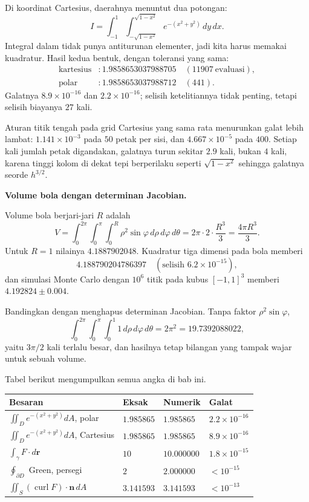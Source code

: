 Di koordinat Cartesius, daerahnya menuntut dua potongan:
\[
I=\int_{-1}^{1}\!\!\int_{-\sqrt{1-x^{2}}}^{\sqrt{1-x^{2}}}
e^{-(x^{2}+y^{2})}\,dy\,dx .
\]
Integral dalam tidak punya antiturunan elementer, jadi kita harus memakai
kuadratur. Hasil kedua bentuk, dengan toleransi yang sama:
\begin{align*}
\text{kartesius}&: 1.9858653037988705 \quad (11907\ \text{evaluasi}),\\
\text{polar}&: 1.9858653037988712 \quad (441).
\end{align*}
Galatnya $8.9\times10^{-16}$ dan $2.2\times10^{-16}$; selisih ketelitiannya
tidak penting, tetapi selisih biayanya $27$ kali.

Aturan titik tengah pada grid Cartesius yang sama rata menurunkan galat lebih
lambat: $1.141\times10^{-3}$ pada $50$ petak per sisi, dan
$4.667\times10^{-5}$ pada $400$. Setiap kali jumlah petak digandakan, galatnya
turun sekitar $2.9$ kali, bukan $4$ kali, karena tinggi kolom di dekat tepi
berperilaku seperti $\sqrt{1-x^{2}}$ sehingga galatnya seorde $h^{3/2}$.

\textbf{Volume bola dengan determinan Jacobian.}

Volume bola berjari-jari $R$ adalah
\[
V=\int_{0}^{2\pi}\!\!\int_{0}^{\pi}\!\!\int_{0}^{R}
\rho^{2}\sin\varphi\,d\rho\,d\varphi\,d\theta
=2\pi\cdot2\cdot\frac{R^{3}}{3}=\frac{4\pi R^{3}}{3}.
\]
Untuk $R=1$ nilainya $4.1887902048$. Kuadratur tiga dimensi pada bola memberi
\[
4.188790204786397 \quad(\text{selisih }6.2\times10^{-15}),
\]
dan simulasi Monte Carlo dengan $10^{6}$ titik pada kubus $[-1,1]^{3}$ memberi
$4.192824\pm0.004$.

Bandingkan dengan menghapus determinan Jacobian. Tanpa faktor
$\rho^{2}\sin\varphi$,
\[
\int_{0}^{2\pi}\!\!\int_{0}^{\pi}\!\!\int_{0}^{1}1\,d\rho\,d\varphi\,d\theta
=2\pi^{2}=19.7392088022,
\]
yaitu $3\pi/2$ kali terlalu besar, dan hasilnya tetap bilangan yang tampak
wajar untuk sebuah volume.



Tabel berikut mengumpulkan semua angka di bab ini.

\begin{center}
{\small
\begin{tabular}{llll}
\hline
Besaran & Eksak & Numerik & Galat \\
\hline
$\iint_{D}e^{-(x^{2}+y^{2})}dA$, polar & $1.985865$ & $1.985865$ & $2.2\times10^{-16}$ \\
$\iint_{D}e^{-(x^{2}+y^{2})}dA$, Cartesius & $1.985865$ & $1.985865$ & $8.9\times10^{-16}$ \\

$\int_{\gamma}F\cdot d\mathbf{r}$ & $10$ & $10.000000$ & $1.8\times10^{-15}$ \\
$\oint_{\partial D}$ Green, persegi & $2$ & $2.000000$ & $<10^{-15}$ \\
$\iint_{S}(\operatorname{curl}F)\cdot\mathbf{n}\,dA$ & $3.141593$ & $3.141593$ & $<10^{-13}$ \\
\hline
\end{tabular}}
\end{center}

